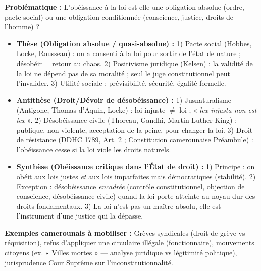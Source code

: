 \documentclass[11pt]{article}
\begin{document}
\begin{exemplebox}
\textbf{Problématique :} L'obéissance à la loi est-elle une obligation absolue (ordre, pacte social) ou une obligation conditionnée (conscience, justice, droits de l'homme) ?
\begin{itemize}
    \item \textbf{Thèse (Obligation absolue / quasi-absolue) :} 1) Pacte social (Hobbes, Locke, Rousseau) : on a consenti à la loi pour sortir de l'état de nature ; désobéir = retour au chaos. 2) Positivisme juridique (Kelsen) : la validité de la loi ne dépend pas de sa moralité ; seul le juge constitutionnel peut l'invalider. 3) Utilité sociale : prévisibilité, sécurité, égalité formelle.
    \item \textbf{Antithèse (Droit/Dévoir de désobéissance) :} 1) Jusnaturalisme (Antigone, Thomas d'Aquin, Locke) : loi injuste $\neq$ loi ; « \emph{lex injusta non est lex} ». 2) Désobéissance civile (Thoreau, Gandhi, Martin Luther King) : publique, non-violente, acceptation de la peine, pour changer la loi. 3) Droit de résistance (DDHC 1789, Art. 2 ; Constitution camerounaise Préambule) : l'obéissance cesse si la loi viole les droits naturels.
    \item \textbf{Synthèse (Obéissance critique dans l'État de droit) :} 1) Principe : on obéit aux lois justes \emph{et} aux lois imparfaites mais démocratiques (stabilité). 2) Exception : désobéissance \emph{encadrée} (contrôle constitutionnel, objection de conscience, désobéissance civile) quand la loi porte atteinte au noyau dur des droits fondamentaux. 3) La loi n'est pas un maître absolu, elle est l'instrument d'une justice qui la dépasse.
\end{itemize}
\textbf{Exemples camerounais à mobiliser :} Grèves syndicales (droit de grève vs réquisition), refus d'appliquer une circulaire illégale (fonctionnaire), mouvements citoyens (ex. « Villes mortes » — analyse juridique vs légitimité politique), jurisprudence Cour Suprême sur l'inconstitutionnalité.
\end{exemplebox}
\end{document}

